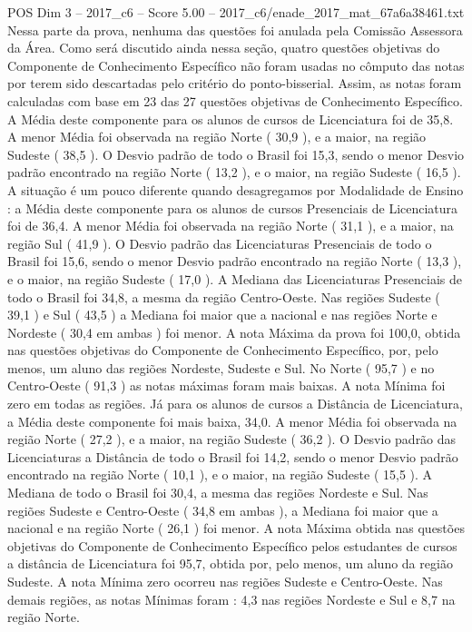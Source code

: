 \begin{textsample}{POS Dim 3 – 2017\_c6 – Score 5.00 – 2017\_c6/enade\_2017\_mat\_67a6a38461.txt}
Nessa parte da prova, nenhuma das questões foi anulada pela Comissão Assessora da Área.
Como será discutido ainda nessa seção, quatro questões objetivas do Componente de Conhecimento Específico não foram usadas no cômputo das notas por terem sido descartadas pelo critério do ponto-bisserial.
Assim, as notas foram calculadas com base em 23 das 27 questões objetivas de Conhecimento Específico.
A Média deste componente para os alunos de cursos de Licenciatura foi de 35,8.
A menor Média foi observada na região Norte ( 30,9 ), e a maior, na região Sudeste ( 38,5 ).
O Desvio padrão de todo o Brasil foi 15,3, sendo o menor Desvio padrão encontrado na região Norte ( 13,2 ), e o maior, na região Sudeste ( 16,5 ).
A situação é um pouco diferente quando desagregamos por Modalidade de Ensino : a Média deste componente para os alunos de cursos Presenciais de Licenciatura foi de 36,4.
A menor Média foi observada na região Norte ( 31,1 ), e a maior, na região Sul ( 41,9 ).
O Desvio padrão das Licenciaturas Presenciais de todo o Brasil foi 15,6, sendo o menor Desvio padrão encontrado na região Norte ( 13,3 ), e o maior, na região Sudeste ( 17,0 ).
A Mediana das Licenciaturas Presenciais de todo o Brasil foi 34,8, a mesma da região Centro-Oeste.
Nas regiões Sudeste ( 39,1 ) e Sul ( 43,5 ) a Mediana foi maior que a nacional e nas regiões Norte e Nordeste ( 30,4 em ambas ) foi menor.
A nota Máxima da prova foi 100,0, obtida nas questões objetivas do Componente de Conhecimento Específico, por, pelo menos, um aluno das regiões Nordeste, Sudeste e Sul.
No Norte ( 95,7 ) e no Centro-Oeste ( 91,3 ) as notas máximas foram mais baixas.
A nota Mínima foi zero em todas as regiões.
Já para os alunos de cursos a Distância de Licenciatura, a Média deste componente foi mais baixa, 34,0.
A menor Média foi observada na região Norte ( 27,2 ), e a maior, na região Sudeste ( 36,2 ).
O Desvio padrão das Licenciaturas a Distância de todo o Brasil foi 14,2, sendo o menor Desvio padrão encontrado na região Norte ( 10,1 ), e o maior, na região Sudeste ( 15,5 ).
A Mediana de todo o Brasil foi 30,4, a mesma das regiões Nordeste e Sul.
Nas regiões Sudeste e Centro-Oeste ( 34,8 em ambas ), a Mediana foi maior que a nacional e na região Norte ( 26,1 ) foi menor.
A nota Máxima obtida nas questões objetivas do Componente de Conhecimento Específico pelos estudantes de cursos a distância de Licenciatura foi 95,7, obtida por, pelo menos, um aluno da região Sudeste.
A nota Mínima zero ocorreu nas regiões Sudeste e Centro-Oeste.
Nas demais regiões, as notas Mínimas foram : 4,3 nas regiões Nordeste e Sul e 8,7 na região Norte.

\end{textsample}
